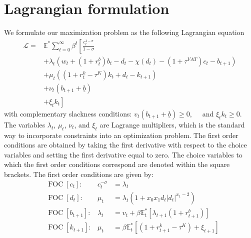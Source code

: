 \section{Lagrangian formulation}
We formulate our maximization problem as the following Lagrangian equation
\begin{equation}
\begin{aligned}
\mathcal{L}= & \mathbb{E}^* \sum_{t=0}^{\infty} \beta^t\left[\frac{c_t^{1-\sigma}}{1-\sigma}\right. \\
& +\lambda_t\left( w_t +\left(1+r_t^b\right) b_t-d_t-\chi (d_t)-(1+\tau^{VAT})c_t-b_{t+1}\right) \\
& +\mu_t\left(\left(1+r^k_t-\tau^K\right) k_t+d_t-k_{t+1}\right) \\
& +\nu_t(b_{t+1}+\underline{b}) \\
& \left.+\xi_t k_t \right]
\end{aligned}
\end{equation}
with complementary slackness conditions: $v_t(b_{t+1}+\underline{b}) \geqslant 0, \quad $ and
$\xi_t k_t \geqslant 0$.
The variables $\lambda_t$, $\mu_t$, $\nu_t$, and $\xi_t$ are Lagrange multipliers, which is the standard way to incorporate constraints into an optimization problem.
The first order conditions are obtained by taking the first derivative with respect to the choice variables and setting the first derivative equal to zero. The choice variables to which the first order conditions correspond are denoted within the square brackets. The first order conditions are given by:
\begin{align}
    &\operatorname{FOC}\left[c_t\right]:& c_t^{-\sigma} &=\lambda_t  \\
    &\operatorname{FOC}\left[d_t\right]:& \mu_t&=\lambda_t\left(1+x_0 x_1 d_t |d_t|^{x_1-2}\right)\\
    &\operatorname{FOC}\left[b_{t+1}\right]:& \lambda_t &=  v_t+\beta \mathbb{E}_t^*\left[\lambda_{t+1}\left(1+r_{t+1}^b\right)\right]\\
    &\operatorname{FOC}\left[k_{t+1}\right]:& \mu_t&=\beta \mathbb{E}_t^*\left[\left(1+r^k_{t+1}-\tau^K\right)+\xi_{t+1} \right]
\end{align}

